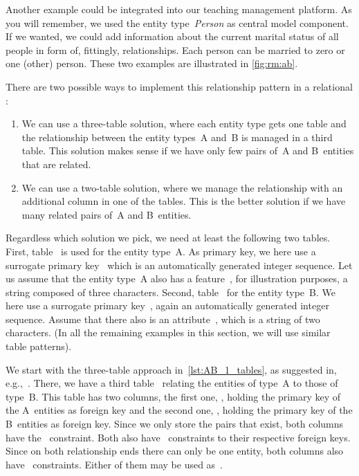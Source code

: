 Another example could be integrated into our teaching management platform.
As you will remember, we used the entity type~\emph{Person} as central model component.
If we wanted, we could add information about the current marital status of all people in form of, fittingly, relationships.
Each person can be married to zero or one (other) person.
These two examples are illustrated in \cref{fig:rm:ab}.

There are two possible ways to implement this relationship pattern in a relational \dbms:%
%
\begin{enumerate}%
%
\item We can use a three-table solution, where each entity type gets one table and the relationship between the entity types~A and~B is managed in a third table.
This solution makes sense if we have only few pairs of~A and B~entities that are related.%
%
\item We can use a two-table solution, where we manage the relationship with an additional column in one of the tables.
This is the better solution if we have many related pairs of~A and B~entities.%
%
\end{enumerate}%
%
Regardless which solution we pick, we need at least the following two tables.
First, table~ is used for the entity type~A.
As primary key, we here use a surrogate primary key~ which is an automatically generated integer sequence.
Let us assume that the entity type~A also has a feature~, for illustration purposes, a string composed of three characters.
Second, table~ for the entity type~B.
We here use a surrogate primary key~, again an automatically generated integer sequence.
Assume that there also is an attribute~, which is a string of two characters.
(In all the remaining examples in this section, we will use similar table patterns).

We start with the three-table approach in~\cref{lst:AB_1_tables}, as suggested in, e.g.,~\cite{S2024D:MEDTRDM}.
There, we have a third table~ relating the entities of type~A to those of type~B.
This table has two columns, the first one, , holding the primary key of the A~entities as foreign key and the second one, , holding the primary key of the B~entities as foreign key.
Since we only store the pairs that exist, both columns have the~ constraint.
Both also have~ constraints to their respective foreign keys.
Since on both relationship ends there can only be one entity, both columns also have ~constraints.
Either of them may be used as~.

